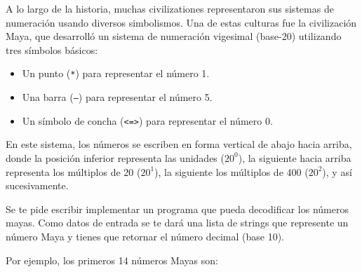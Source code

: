 
A lo largo de la historia, muchas civilizationes representaron sus sistemas de numeraci\'on usando diversos simbolismos. Una de estas culturas fue la civilización Maya, que desarrolló un sistema de numeración vigesimal (base-20) utilizando tres símbolos básicos:

\begin{itemize}
    \item Un punto (\texttt{*}) para representar el número 1.
    \item Una barra (\texttt{---}) para representar el número 5.
    \item Un símbolo de concha (\texttt{<=>}) para representar el número 0.
\end{itemize}

En este sistema, los números se escriben en forma vertical de abajo hacia arriba, donde la posición inferior representa las unidades ($20^0$), la siguiente hacia arriba representa los múltiplos de 20 ($20^1$), la siguiente los múltiplos de 400 ($20^2$), y así sucesivamente.

Se te pide escribir implementar un programa que pueda decodificar los n\'umeros mayas. Como datos de entrada se te dar\'a una lista de strings que represente un n\'umero Maya y tienes que retornar el n\'umero decimal (base 10).

Por ejemplo, los primeros 14 n\'umeros Mayas son:


